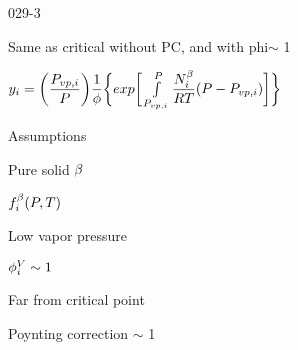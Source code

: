 \begin{mitframe}{029-3}

        \begin{listone}
        
        \item Same as critical without PC, and with phi$\sim$ 1
  
		\item $y_{i}=\bigg(\dfrac{\p_{vp,\state}}{\p}\bigg)\dfrac{1}{\eleccoeff}\bigg\{exp\bigg[\int\limits_{\p_{vp,\state}}^{\p}\dfrac{\nummoles_{\state}^{\texpcoeff}}{\gasconst\Temp}(\p-\p_{vp,\state})\bigg]\bigg\}$
	
		\item Assumptions
 
			\begin{listtwo}
                    \item Pure solid $\texpcoeff$ 
            
             
             		\begin{listthree}
                    		\item$\fug_{\state}^{\texpcoeff}(\p,\Temp)$
                    \end{listthree}
               
               \item Low vapor pressure
      
                    \begin{listthree}
                    		\item $\eleccoeff_{\state}^{\vol}\sim{1}$
                  	\end{listthree}

              \item Far from critical point
                               
                   \begin{listthree}
                         \item Poynting correction $\sim$ 1
                   \end{listthree}
  			\end{listtwo}
  \end{listone}
\end{mitframe}